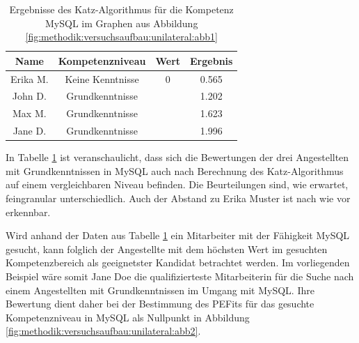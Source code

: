 \begin{table}[h]
	\centering
	\begin{tabular}{c|c|c|c}
		Name & Kompetenzniveau & Wert & Ergebnis \\
		\hline
		 \rowcolor{exxetagray}Erika M. & Keine Kenntnisse & 0                  & 0.565\\
		\hline
		\rowcolor{itemcolor}John D.    & Grundkenntnisse  & \kantengewicht     & 1.202\\
		\rowcolor{itemcolor}Max M.     & Grundkenntnisse  & \kantengewicht     & 1.623\\
		\rowcolor{itemcolor}Jane D.    & Grundkenntnisse  & \kantengewicht     & 1.996
	\end{tabular}
	\caption{Ergebnisse des Katz-Algorithmus für die Kompetenz MySQL im Graphen aus Abbildung \ref{fig:methodik:versuchsaufbau:unilateral:abb1}}
	\label{tbl:methodik:versuchsaufbau:unilateral:tbl1}
\end{table}

In Tabelle \ref{tbl:methodik:versuchsaufbau:unilateral:tbl1} ist veranschaulicht, dass sich die Bewertungen der drei Angestellten mit Grundkenntnissen in MySQL auch nach Berechnung des Katz-Algorithmus auf einem vergleichbaren Niveau befinden. Die Beurteilungen sind, wie erwartet, feingranular unterschiedlich. Auch der Abstand zu Erika Muster ist nach wie vor erkennbar.

Wird anhand der Daten aus Tabelle \ref{tbl:methodik:versuchsaufbau:unilateral:tbl1} ein Mitarbeiter mit der Fähigkeit MySQL gesucht, kann folglich der Angestellte mit dem höchsten Wert im gesuchten Kompetenzbereich als geeignetster Kandidat betrachtet werden. Im vorliegenden Beispiel wäre somit Jane Doe die qualifizierteste Mitarbeiterin für die Suche nach einem Angestellten mit Grundkenntnissen im Umgang mit MySQL. Ihre Bewertung dient daher bei der Bestimmung des \acp{PEFit} für das gesuchte Kompetenzniveau in MySQL als Nullpunkt in Abbildung \ref{fig:methodik:versuchsaufbau:unilateral:abb2}.

